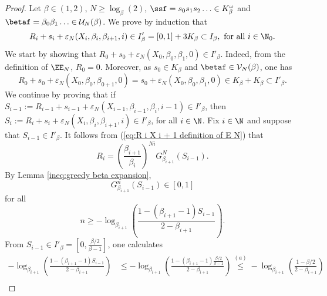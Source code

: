 \begin{proof} 
	Let $\beta \in (1,2)$, $N \geq \log_\beta(2)$, $\ssf = s_0s_1s_2\ldots \in K_\beta^\omega$ and $\betaf =\beta_0\beta_1\ldots \in \mathcal U_N(\beta)$. We prove by induction that
	\begin{equation}\label{eq:condition Ri si beta i}
		R_i + s_i + \varepsilon_N(X_i, \beta_i, \beta_{i+1} , i) \in I'_\beta = [0,1] + 3K_\beta \subset I_\beta, \ \text{for all}\ i \in \N_0.
	\end{equation}
	We start by showing that $R_0 + s_0 + \varepsilon_N(X_0, \beta_0, \beta_{1} , 0) \in I'_\beta$. Indeed, from the definition of $\EE_N$, $R_0 = 0$. Moreover, as $s_0 \in K_\beta$ and $\betaf \in \mathcal V_N(\beta)$, one has
	\begin{equation}
		R_0 + s_0 + \varepsilon_N(X_0, \beta_0, \beta_{0+1} , 0) = s_0 + \varepsilon_N(X_0, \beta_0, \beta_{1} , 0) \in K_\beta + K_\beta \subset I'_\beta.
	\end{equation}
	We continue by proving that if $S_{i-1} := R_{i-1} + s_{i-1} + \varepsilon_N(X_{i-1}, \beta_{i-1}, \beta_{i} , i-1)  \in I'_\beta$, then $S_i := R_{i} + s_i+ \varepsilon_N(X_i, \beta_i, \beta_{i+1} , i) \in I'_\beta$, for all $i \in \N$. Fix $i \in \N$ and suppose that $S_{i-1}\in I'_\beta$. It follows from (\ref{eq:R i X i + 1 definition of E N}) that
	\begin{equation}\label{eq:relation R i+1 R i s i beta i}
		R_i = \left(\frac{\beta_{i+1}}{\beta_{i}}\right)^{Ni} G_{\beta_{i+1}}^N\left(S_{i-1}\right).
	\end{equation}
	By Lemma \ref{ineq:greedy beta expansion}, 
	\begin{equation}
		G_{\beta_{i+1}}^n\left(S_{i-1}\right) \in [0,1]
	\end{equation}
	for all
	\begin{equation}\label{eq:condition on n for convergence of greedy expansion beta r}
		n \geq - \log_{\beta_{i+1}}\left( \frac{1 - ({\beta_{i+1}} - 1)S_{i-1}}{2- {\beta_{i+1}}} \right).
	\end{equation}
	From $S_{i-1} \in I'_\beta = \left[0, \frac{\beta/2}{\beta-1}\right]$, one calculates
	\begin{align}
		- \log_{\beta_{i+1}}\left( \frac{1 - ({\beta_{i+1}} - 1)S_{i-1}}{2- {\beta_{i+1}}} \right) &\leq - \log_{\beta_{i+1}}\left( \frac{1 - ({\beta_{i+1}} - 1)\frac{\beta/2}{\beta-1}}{2- {\beta_{i+1}}} \right)\overset{(a)}{\leq} - \log_{\beta_{i+1}}\left( \frac{1 - \beta/2}{2- {\beta_{i+1}}} \right)\nonumber\\

\end{align}
\end{proof}
